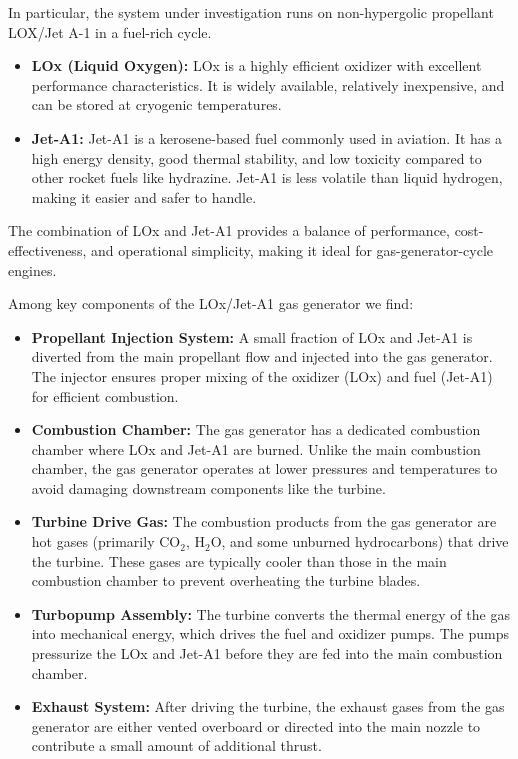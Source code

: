 \documentclass[12pt]{article}
\begin{document}
In particular, the system under investigation runs on non-hypergolic propellant LOX/Jet A-1 in a fuel-rich cycle.
\begin{itemize}
    \item \textbf{LOx (Liquid Oxygen):} LOx is a highly efficient oxidizer with excellent performance characteristics. It is widely available, relatively inexpensive, and can be stored at cryogenic temperatures.
    \item \textbf{Jet-A1:} Jet-A1 is a kerosene-based fuel commonly used in aviation. It has a high energy density, good thermal stability, and low toxicity compared to other rocket fuels like hydrazine. Jet-A1 is less volatile than liquid hydrogen, making it easier and safer to handle.
\end{itemize}

The combination of LOx and Jet-A1 provides a balance of performance, cost-effectiveness, and operational simplicity, making it ideal for gas-generator-cycle engines.

Among key components of the LOx/Jet-A1 gas generator we find:
\begin{itemize}
    \item \textbf{Propellant Injection System:} A small fraction of LOx and Jet-A1 is diverted from the main propellant flow and injected into the gas generator. The injector ensures proper mixing of the oxidizer (LOx) and fuel (Jet-A1) for efficient combustion.
    \item \textbf{Combustion Chamber:} The gas generator has a dedicated combustion chamber where LOx and Jet-A1 are burned. Unlike the main combustion chamber, the gas generator operates at lower pressures and temperatures to avoid damaging downstream components like the turbine.
    \item \textbf{Turbine Drive Gas:} The combustion products from the gas generator are hot gases (primarily $\text{CO}_2$, $\text{H}_2\text{O}$, and some unburned hydrocarbons) that drive the turbine. These gases are typically cooler than those in the main combustion chamber to prevent overheating the turbine blades.
    \item \textbf{Turbopump Assembly:} The turbine converts the thermal energy of the gas into mechanical energy, which drives the fuel and oxidizer pumps. The pumps pressurize the LOx and Jet-A1 before they are fed into the main combustion chamber.
    \item \textbf{Exhaust System:} After driving the turbine, the exhaust gases from the gas generator are either vented overboard or directed into the main nozzle to contribute a small amount of additional thrust.
\end{itemize}
\end{document}
